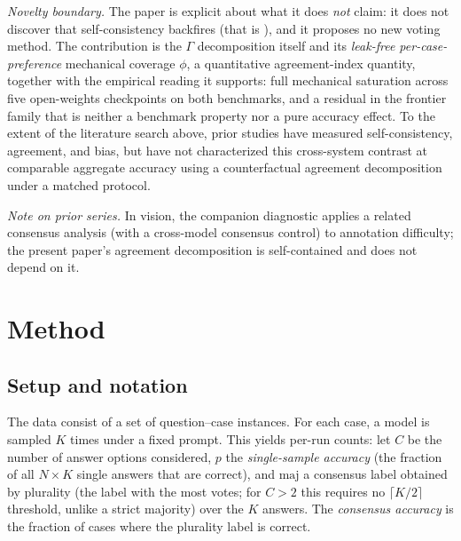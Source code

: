 \documentclass[a4paper,fleqn]{cas-sc}
\newcommand{\agreementIndex}{\Gamma}
\begin{document}
\emph{Novelty boundary.}
The paper is explicit about what it does \emph{not} claim: it does not discover that self-consistency backfires (that is \cite{bahuguna2026when}), and it proposes no new voting method.
The contribution is the $\agreementIndex$ decomposition itself and its
\emph{leak-free per-case-preference} mechanical coverage $\phi$, a
quantitative agreement-index quantity, together with the empirical
reading it supports: full mechanical saturation across
five open-weights checkpoints on both benchmarks, and a residual in
the frontier family that is neither a benchmark property nor a pure
accuracy effect. To the extent of the literature
search above, prior studies have measured self-consistency, agreement,
and bias, but have not characterized this cross-system contrast at
comparable aggregate accuracy using a counterfactual agreement decomposition under a
matched protocol.

\emph{Note on prior series.}
In vision, the companion diagnostic \cite{anchorscore2026} applies a
related consensus analysis (with a cross-model consensus control) to
annotation difficulty; the present paper's agreement decomposition is
self-contained and does not depend on it.

\section{Method}
\label{sec:method}

\subsection{Setup and notation}
\label{sec:setup}

The data consist of a set of question--case instances. For each case, a model is
sampled $K$ times under a fixed prompt. This yields per-run counts: let
$C$ be the number of answer options considered, $p$ the
\emph{single-sample accuracy} (the fraction of all $N\times K$ single
answers that are correct), and $\mathrm{maj}$ a consensus label
obtained by plurality (the label with the most votes; for $C>2$ this
requires no $\lceil K/2\rceil$ threshold, unlike a strict majority) over
the $K$ answers. The \emph{consensus accuracy} is the fraction of cases
where the plurality label is correct.
\end{document}
